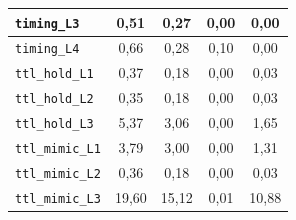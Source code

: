 \begin{table}[!ht]
\begin{tabular}{|l|c|c|c|c|}
        \hline
        \texttt{timing\_L3} & 0,51 & 0,27 & 0,00 & 0,00 \\
        \hline
        \texttt{timing\_L4} & 0,66 & 0,28 & 0,10 & 0,00 \\
        \hline
        \texttt{ttl\_hold\_L1} & 0,37 & 0,18 & 0,00 & 0,03 \\
        \hline
        \texttt{ttl\_hold\_L2} & 0,35 & 0,18 & 0,00 & 0,03 \\
        \hline
        \texttt{ttl\_hold\_L3} & 5,37 & 3,06 & 0,00 & 1,65 \\
        \hline
        \texttt{ttl\_mimic\_L1} & 3,79 & 3,00 & 0,00 & 1,31 \\
        \hline
        \texttt{ttl\_mimic\_L2} & 0,36 & 0,18 & 0,00 & 0,03 \\
        \hline
        \texttt{ttl\_mimic\_L3} & 19,60 & 15,12 & 0,01 & 10,88 \\
        \hline
    \end{tabular}
    \label{tab:anexa-o6-rf}
\end{table}

